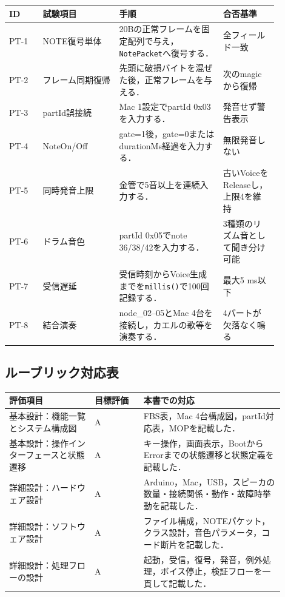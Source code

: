 \documentclass[a4paper,11pt]{jsarticle}
\begin{document}
\begin{longtable}{p{0.11\linewidth}p{0.25\linewidth}p{0.34\linewidth}p{0.18\linewidth}}
\toprule
ID & 試験項目 & 手順 & 合否基準 \\
\midrule
\endhead
PT-1 & NOTE復号単体 & 20Bの正常フレームを固定配列で与え，\texttt{NotePacket}へ復号する． & 全フィールド一致 \\
PT-2 & フレーム同期復帰 & 先頭に破損バイトを混ぜた後，正常フレームを与える． & 次のmagicから復帰 \\
PT-3 & partId誤接続 & Mac 1設定でpartId 0x03を入力する． & 発音せず警告表示 \\
PT-4 & NoteOn/Off & gate=1後，gate=0またはdurationMs経過を入力する． & 無限発音しない \\
PT-5 & 同時発音上限 & 金管で5音以上を連続入力する． & 古いVoiceをReleaseし，上限4を維持 \\
PT-6 & ドラム音色 & partId 0x05でnote 36/38/42を入力する． & 3種類のリズム音として聞き分け可能 \\
PT-7 & 受信遅延 & 受信時刻からVoice生成までを\texttt{millis()}で100回記録する． & 最大5 ms以下 \\
PT-8 & 結合演奏 & node\_02--05とMac 4台を接続し，カエルの歌等を演奏する． & 4パートが欠落なく鳴る \\
\bottomrule
\end{longtable}

\subsection{ルーブリック対応表}

\begin{longtable}{p{0.28\linewidth}p{0.16\linewidth}p{0.46\linewidth}}
\toprule
評価項目 & 目標評価 & 本書での対応 \\
\midrule
\endhead
基本設計：機能一覧とシステム構成図 & A & FBS表，Mac 4台構成図，partId対応表，MOPを記載した． \\
基本設計：操作インターフェースと状態遷移 & A & キー操作，画面表示，BootからErrorまでの状態遷移と状態定義を記載した． \\
詳細設計：ハードウェア設計 & A & Arduino，Mac，USB，スピーカの数量・接続関係・動作・故障時挙動を記載した． \\
詳細設計：ソフトウェア設計 & A & ファイル構成，NOTEパケット，クラス設計，音色パラメータ，コード断片を記載した． \\
詳細設計：処理フローの設計 & A & 起動，受信，復号，発音，例外処理，ボイス停止，検証フローを一貫して記載した． \\
\bottomrule
\end{longtable}
\end{document}
